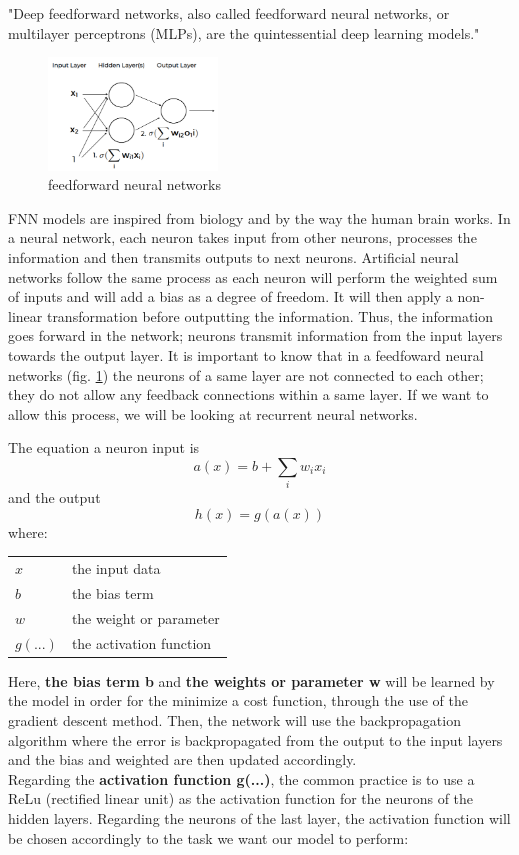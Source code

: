\documentclass[letter,8pt]{article}\usepackage[]{graphicx}\usepackage[]{color}
\makeatletter
\newenvironment{conditions}
  {\par\vspace{\abovedisplayskip}\noindent\begin{tabular}{>{$}l<{$} @{${}={}$} l}}
  {\end{tabular}\par\vspace{\belowdisplayskip}}
\makeatother
\begin{document}
"Deep feedforward networks, also called feedforward neural networks, or multilayer perceptrons (MLPs), are the quintessential deep learning models." \cite{Goodfellow-et-al-2016}
\begin{figure}
  \begin{center}
    \includegraphics[width=0.4\textwidth]{figure/feedforward_neural_networks.png}
  \end{center}
  \caption{feedforward neural networks}
  \label{fig:attention}
\end{figure}
FNN models are inspired from biology and by the way the human brain works. In a neural network, each neuron takes input from other neurons, processes the information and then transmits outputs to next neurons. Artificial neural networks follow the same process as each neuron will perform the weighted sum of inputs and will add a bias as a degree of freedom. It will then apply a non-linear transformation before outputting the information. Thus, the information goes forward in the network; neurons transmit information from the input layers towards the output layer. It is important to know that in a feedfoward neural networks (fig. \ref{fig:attention}) the neurons of a same layer are not connected to each other; they do not allow any feedback connections within a same layer. If we want to allow this process, we will be looking at recurrent neural networks.

The equation a neuron input is  
\begin{equation}
a(x) = b +\sum_{i}{w_i x_i}
\end{equation}
and the output
\begin{equation}
h(x) = g(a(x))
\end{equation}
where:
\begin{conditions}
 x     &  the input data \\
 b     &  the bias term \\
 w     &  the weight or parameter \\   
 g(...) &  the activation function
\end{conditions}


Here, \textbf{the bias term  b} and \textbf{the weights or parameter w} will be learned by the model in order for the minimize a cost function, through the use of the gradient descent method. Then, the network will use the backpropagation algorithm where the error is backpropagated from the output to the input layers and the bias and weighted are then updated accordingly.\\
Regarding the \textbf{activation function g(...)}, the common practice is to use a ReLu (rectified linear unit) as the activation function for the neurons of the hidden layers. Regarding the neurons of the last layer, the activation function will be chosen accordingly to the task we want our model to perform:
\end{document}

